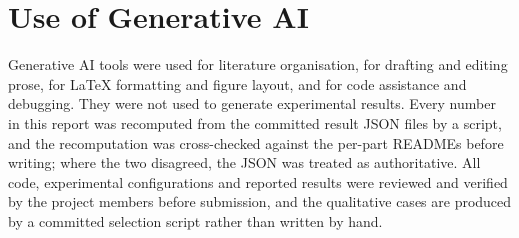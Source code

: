 \documentclass[10pt,a4paper,twocolumn]{article}
\begin{document}
\section{Use of Generative AI}

Generative AI tools were used for literature organisation, for drafting and
editing prose, for LaTeX formatting and figure layout, and for code assistance and
debugging. They were not used to generate experimental results. Every number in
this report was recomputed from the committed result JSON files by a script, and
the recomputation was cross-checked against the per-part READMEs before writing;
where the two disagreed, the JSON was treated as authoritative. All code,
experimental configurations and reported results were reviewed and verified by the
project members before submission, and the qualitative cases are produced by a
committed selection script rather than written by hand.
\end{document}
